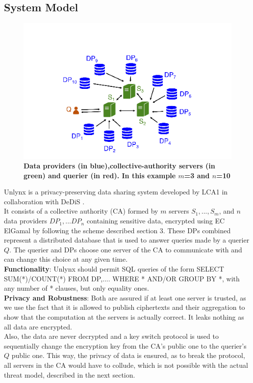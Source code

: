 \documentclass{article}
\begin{document}
\subsection{System Model}
\begin{figure}[H]
\centering
\includegraphics[scale=0.65]{img/UnlynxFunc.png}
\caption{\textbf{Data providers (in blue),collective-authority servers (in green) and querier (in red). In this example $m$=3 and $n$=10}}
\end{figure}
Unlynx is a privacy-preserving data sharing system developed by LCA1 \cite{lca} in collaboration with DeDiS \cite{dedis}.\\
It consists of a collective authority (CA) formed by $m$ servers $S_1,...,S_m$, and $n$ data providers $DP_1,...DP_n$ containing sensitive data, encrypted using EC ElGamal by following the scheme described section 3. These DPs combined represent a distributed database that is used to answer queries made by a querier $Q$. The querier and DPs choose one server of the CA to communicate with and can change this choice at any given time.\\
\textbf{Functionality}: Unlynx should permit SQL queries of the form SELECT SUM(*)/COUNT(*) FROM DP,.... WHERE * AND/OR GROUP BY *, with any number of * clauses, but only equality ones.\\
\textbf{Privacy and Robustness}: Both are assured if at least one server is trusted, as we use the fact that it is allowed to publish ciphertexts and their aggregation to show that the computation at the servers is actually correct. It leaks nothing as all data are encrypted.\\
Also, the data are never decrypted and a key switch protocol is used to sequentially change the encryption key from the CA's public one to the querier's $Q$ public one. This way, the privacy of data is ensured, as to break the protocol, all servers in the CA would have to collude, which is not possible with the actual threat model, described in the next section.
\end{document}
